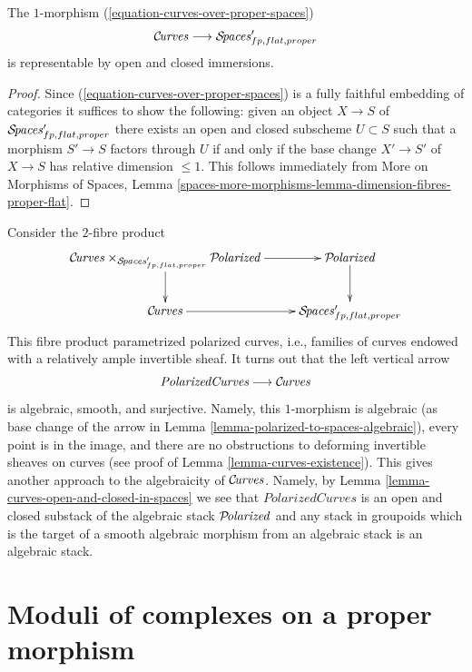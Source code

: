 \begin{lemma}
\label{lemma-curves-open-and-closed-in-spaces}
The $1$-morphism (\ref{equation-curves-over-proper-spaces})
$$
\mathcal{C}\!\mathit{urves} \longrightarrow \mathcal{S}\!\mathit{paces}'_{fp, flat, proper}
$$
is representable by open and closed immersions.
\end{lemma}

\begin{proof}
Since (\ref{equation-curves-over-proper-spaces}) is a fully faithful
embedding of categories it suffices to show the following:
given an object $X \to S$ of $\mathcal{S}\!\mathit{paces}'_{fp, flat, proper}$
there exists an open and closed subscheme $U \subset S$
such that a morphism $S' \to S$ factors through $U$ if and only if the
base change $X' \to S'$ of $X \to S$ has relative dimension $\leq 1$.
This follows immediately from
More on Morphisms of Spaces, Lemma
\ref{spaces-more-morphisms-lemma-dimension-fibres-proper-flat}.
\end{proof}

\begin{remark}
\label{remark-alternative-approach-curves}
Consider the $2$-fibre product
$$
\xymatrix{
\Curvesstack \times_{\Spacesstack'_{fp, flat, proper}}
\Polarizedstack \ar[r] \ar[d] &
\Polarizedstack \ar[d] \\
\Curvesstack \ar[r] &
\Spacesstack'_{fp, flat, proper}
}
$$
This fibre product parametrized polarized curves, i.e., families
of curves endowed with a relatively ample invertible sheaf.
It turns out that the left vertical arrow
$$
\textit{PolarizedCurves} \longrightarrow \mathcal{C}\!\mathit{urves}
$$
is algebraic, smooth, and surjective. Namely, this $1$-morphism
is algebraic (as base change of the arrow in
Lemma \ref{lemma-polarized-to-spaces-algebraic}),
every point is in the image, and
there are no obstructions to deforming invertible sheaves on curves
(see proof of Lemma \ref{lemma-curves-existence}).
This gives another approach to the algebraicity of $\mathcal{C}\!\mathit{urves}$.
Namely, by Lemma \ref{lemma-curves-open-and-closed-in-spaces}
we see that $\textit{PolarizedCurves}$ is an open and closed substack
of the algebraic stack $\mathcal{P}\!\mathit{olarized}$ and any stack in groupoids
which is the target of a smooth algebraic morphism from an algebraic
stack is an algebraic stack.
\end{remark}









\section{Moduli of complexes on a proper morphism}
\label{section-moduli-complexes}


